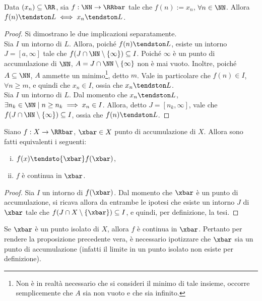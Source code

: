 \documentclass[11pt]{article}
\begin{document}
	\begin{proposition}
		Data $(x_n) \subseteq \RR$, sia $f : \NN \to \RRbar$ tale
		che $f(n) := x_n$, $\forall n \in \NN$. Allora $f(n) \tendston L \iff x_n \tendston L$.
	\end{proposition}

	\begin{proof} Si dimostrano le due implicazioni separatamente. \\
		
		\rightproof Sia $I$ un intorno di $L$. Allora, poiché $f(n) \tendston L$,
		esiste un intorno $J = [a, \infty]$ tale che $f(J \cap \NN \setminus \{\infty\}) \subseteq I$.
		Poiché $\infty$ è un punto di accumulazione di $\NN$, $A = J \cap \NN \setminus \{\infty\}$ non è mai
		vuoto. Inoltre, poiché $A \subseteq \NN$, $A$ ammette un minimo\footnote{Non è in realtà necessario che
		si consideri il minimo di tale insieme, occorre semplicemente che $A$ sia non vuoto e che sia infinito.}, detto $m$.
		Vale in particolare che
		$f(n) \in I$, $\forall n \geq m$, e quindi che $x_n \in I$, ossia che $x_n \tendston L$. \\
		
		\leftproof Sia $I$ un intorno di $L$. Dal momento che $x_n \tendston L$, $\exists n_k \in \NN \mid n \geq n_k \implies
		x_n \in I$. Allora, detto $J = [n_k, \infty]$, vale che $f(J \cap \NN \setminus \{\infty\}) \subseteq I$, ossia
		che $f(n) \tendston L$.
	\end{proof}

	\begin{proposition}
		Siano $f : X \to \RRbar$, $\xbar \in X$ punto di accumulazione
		di $X$. Allora sono fatti equivalenti i seguenti:
		
		\begin{enumerate}[(i)]
			\item $f(x) \tendsto{\xbar} f(\xbar)$,
			\item $f$ è continua in $\xbar$.
		\end{enumerate}
	\end{proposition}

	\begin{proof}
		Sia $I$ un intorno di $f(\xbar)$. Dal momento che $\xbar$ è un punto di accumulazione, si ricava allora da
		entrambe le ipotesi che esiste un intorno $J$ di $\xbar$ tale che
		$f(J \cap X \setminus \{\xbar\}) \subseteq I$, e quindi, per definizione, la tesi.
	\end{proof}

	\begin{remark}
		Se $\xbar$ è un punto isolato di $X$, allora $f$ è continua
		in $\xbar$. Pertanto per rendere la proposizione precedente
		vera, è necessario ipotizzare che $\xbar$ sia un punto
		di accumulazione (infatti il limite in un punto isolato
		non esiste per definizione).
	\end{remark}
\end{document}

